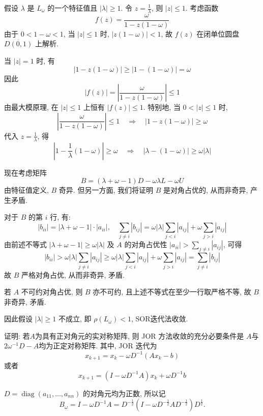 \documentclass[12pt, answers]{exam}     %
\begin{document}
\begin{questions}
\begin{solution}
假设 \( \lambda \) 是 \( L_{\omega} \) 的一个特征值且 \( |\lambda| \geq 1 \). 令 \( z = \frac{1}{\lambda} \), 则 \( |z| \leq 1 \). 考虑函数
\[
f(z) = \frac{\omega}{1 - z(1 - \omega)}
\]
由于 \( 0 < 1 - \omega < 1 \), 当 \( |z| \leq 1 \) 时, \( |z(1 - \omega)| < 1 \), 故 \( f(z) \) 在闭单位圆盘 \( \overline{D(0,1)} \) 上解析.

当 \( |z| = 1 \) 时, 有
\[
|1 - z(1 - \omega)| \geq |1 - (1 - \omega)| = \omega
\]
因此
\[
|f(z)| = \left| \frac{\omega}{1 - z(1 - \omega)} \right| \leq 1
\]
由最大模原理, 在 \( |z| \leq 1 \) 上恒有 \( |f(z)| \leq 1 \). 特别地, 当 \( 0 < |z| \leq 1 \) 时,
\[
\left| \frac{\omega}{1 - z(1 - \omega)} \right| \leq 1 \quad \Rightarrow \quad |1 - z(1 - \omega)| \geq \omega
\]
代入 \( z = \frac{1}{\lambda} \), 得
\[
\left| 1 - \frac{1}{\lambda}(1 - \omega) \right| \geq \omega \quad \Rightarrow \quad |\lambda - (1 - \omega)| \geq \omega |\lambda|
\]

现在考虑矩阵
\[
B = (\lambda + \omega - 1)D - \omega \lambda L - \omega U
\]
由特征值定义, \( B \) 奇异. 但另一方面, 我们将证明 \( B \) 是对角占优的, 从而非奇异, 产生矛盾.

对于 \( B \) 的第 \( i \) 行, 有:
\[
|b_{ii}| = |\lambda + \omega - 1| \cdot |a_{ii}|, \quad \sum_{j \neq i} |b_{ij}| = \omega |\lambda| \sum_{j < i} |a_{ij}| + \omega \sum_{j > i} |a_{ij}|
\]
由前述不等式 \( |\lambda + \omega - 1| \geq \omega |\lambda| \) 及 \( A \) 的对角占优性 \( |a_{ii}| > \sum_{j \neq i} |a_{ij}| \), 可得
\[
|b_{ii}| > \omega |\lambda| \sum_{j \neq i} |a_{ij}| \geq \omega |\lambda| \sum_{j < i} |a_{ij}| + \omega \sum_{j > i} |a_{ij}| = \sum_{j \neq i} |b_{ij}|
\]
故 \( B \) 严格对角占优, 从而非奇异, 矛盾.

若 \( A \) 不可约对角占优, 则 \( B \) 亦不可约, 且上述不等式在至少一行取严格不等, 故 \( B \) 非奇异, 矛盾.

因此假设 \( |\lambda| \geq 1 \) 不成立, 即 \( \rho(L_{\omega}) < 1 \), SOR迭代法收敛.
\end{solution}


\question{}证明: 若\(A\)为具有正对角元的实对称矩阵, 则 JOR 方法收敛的充分必要条件是 \(A\)与\(2\omega^{-1}D-A\)均为正定对称矩阵. 
其中, JOR 迭代为\[ x_{k+1} = x_k - \omega D^{-1} (Ax_k - b) \]
或者
\[ x_{k+1} = (I - \omega D^{-1} A)x_k + \omega D^{-1} b \]
\begin{solution}
$D = \operatorname{diag}(a_{11}, \ldots, a_{nn})$ 的对角元均为正数, 所以记
\[
B_{\omega} = I - \omega D^{-1}A = D^{-\frac{1}{2}}(I - \omega D^{-\frac{1}{2}}AD^{-\frac{1}{2}})D^{\frac{1}{2}}. 
\]


\end{solution}
\end{questions}
\end{document}
